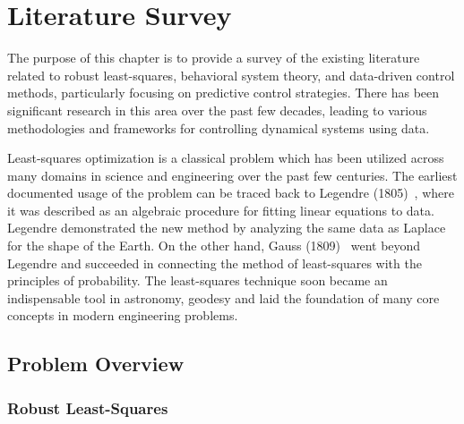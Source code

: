 \chapter{Literature Survey} \label{ch:literature-survey}
\vspace{2ex}

The purpose of this chapter is to provide a survey of the existing literature related to robust least-squares, behavioral system theory, and data-driven control methods, particularly focusing on predictive control strategies. There has been significant research in this area over the past few decades, leading to various methodologies and frameworks for controlling dynamical systems using data. 

Least-squares optimization is a classical problem which has been utilized across many domains in science and engineering over the past few centuries. The earliest documented usage of the problem can be traced back to Legendre (1805)~\cite{Legendre1805}, where it was described as an algebraic procedure for fitting linear equations to data. Legendre demonstrated the new method by analyzing the same data as Laplace for the shape of the Earth. On the other hand, Gauss (1809)~\cite{Gauss1809} went beyond Legendre and succeeded in connecting the method of least-squares with the principles of probability. The least-squares technique soon became an indispensable tool in astronomy, geodesy and laid the foundation of many core concepts in modern engineering problems.

\section{Problem Overview}
\subsection{Robust Least-Squares}

